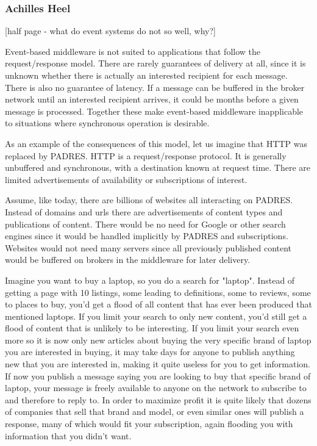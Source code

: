 \documentclass{acm_proc_article-sp}
\begin{document}

\subsubsection{Achilles Heel}

[half page - what do event systems do not so well, why?]

Event-based middleware is not suited to applications that follow the request/response model. There are rarely guarantees of delivery  at all, since it is unknown whether there is actually an interested recipient for each message. There is also no guarantee of latency. If a message can be buffered in the broker network until an interested recipient arrives, it could be months before a given message is processed. Together these make event-based middleware inapplicable to situations where synchronous operation is desirable.

As an example of the consequences of this model, let us imagine that HTTP was replaced by PADRES. HTTP is a request/response protocol. It is generally unbuffered and synchronous, with a destination known at request time. There are limited advertisements of availability or subscriptions of interest.

Assume, like today, there are billions of websites all interacting on PADRES. Instead of domains and urls there are advertisements of content types and publications of content. There would be no need for Google or other search engines since it would be handled implicitly by PADRES and subscriptions. Websites would not need many servers since all previously published content would be buffered on brokers in the middleware for later delivery.

Imagine you want to buy a laptop, so you do a search for "laptop". Instead of getting a page with 10 listings, some leading to definitions, some to reviews, some to places to buy, you'd get a flood of all content that has ever been produced that mentioned laptops. If you limit your search to only new content, you'd still get a flood of content that is unlikely to be interesting. If you limit your search even more so it is now only new articles about buying the very specific brand of laptop you are interested in buying, it may take days for anyone to publish anything new that you are interested in, making it quite useless for you to get information. If now you publish a message saying you are looking to buy that specific brand of laptop, your message is freely available to anyone on the network to subscribe to and therefore to reply to. In order to maximize profit it is quite likely that dozens of companies that sell that brand and model, or even similar ones will publish a response, many of which would fit your subscription, again flooding you with information that you didn't want.
\end{document}

